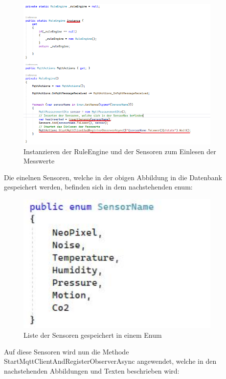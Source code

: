 \begin{figure}[H]
    \centering
    \includegraphics[width=0.9\textwidth]{pics/InstanzierenDerRuleEngineUndAufrufenDerMQTTMesswerte.png}
    \caption{Instanzieren der RuleEngine und der Sensoren zum Einlesen der Messwerte}
\end{figure}

Die einelnen Sensoren, welche in der obigen Abbildung in die Datenbank gespeichert werden,
befinden sich in dem nachstehenden enum:

\begin{figure}[H]
    \centering
    \includegraphics[width=0.9\textwidth]{pics/SensorEnum.JPG}
    \caption{Liste der Sensoren gespeichert in einem Enum}
\end{figure}

Auf diese Sensoren wird nun die Methode StartMqttClientAndRegisterObserverAsync angewendet,
welche in den nachstehenden Abbildungen und Texten beschrieben wird:

